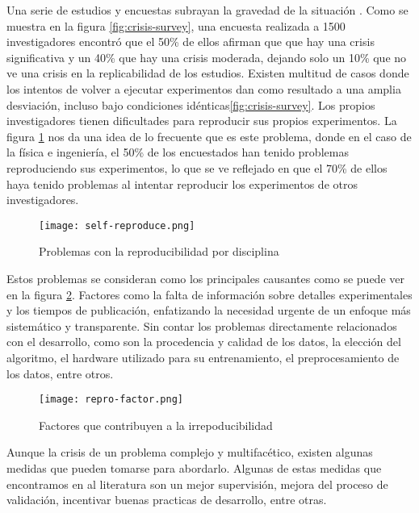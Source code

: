 Una serie de estudios y encuestas subrayan la gravedad de la situación \cite{Baker_2016}.
Como se muestra en la figura \ref{fig:crisis-survey}, una encuesta realizada a 1500 investigadores
encontró que el 50\% de ellos afirman que que hay una crisis significativa y un 40\% que hay
una crisis moderada, dejando solo un 10\% que no ve una crisis en la replicabilidad de los estudios.
Existen multitud de casos donde los intentos de volver a ejecutar experimentos dan como resultado 
a una amplia desviación, incluso bajo condiciones idénticas\ref{fig:crisis-survey}.
Los propios investigadores tienen dificultades para reproducir sus propios experimentos.
La figura \ref{fig:self-reproduce} nos da una idea de lo frecuente que es este problema,
donde en el caso de la física e ingeniería, el 50\% de los encuestados han tenido problemas
reproduciendo sus experimentos, lo que se ve reflejado en que el 70\% de ellos haya tenido
problemas al intentar reproducir los experimentos de otros investigadores.

\begin{figure}[ht]
    \centering
    \texttt{[image: self-reproduce.png]}
    \caption{Problemas con la reproducibilidad por disciplina \cite{Baker_2016}}\label{fig:self-reproduce}
\end{figure}

Estos problemas se consideran como los principales causantes como se puede ver en la figura \ref{fig:repro-factor}.
Factores como la falta de información sobre detalles experimentales y los tiempos de publicación, enfatizando 
la necesidad urgente de un enfoque más sistemático y transparente. Sin contar los problemas
directamente relacionados con el desarrollo, como son la procedencia y calidad de los datos, la 
elección del algoritmo, el hardware utilizado para su entrenamiento, el preprocesamiento de 
los datos, entre otros.

\begin{figure}[ht]
    \centering
    \texttt{[image: repro-factor.png]}
    \caption{Factores que contribuyen a la irrepoducibilidad \cite{Baker_2016}}\label{fig:repro-factor}
\end{figure}

Aunque la crisis de un problema complejo y multifacético, existen
algunas medidas que pueden tomarse para abordarlo. Algunas de estas medidas que encontramos
en al literatura son un mejor supervisión, mejora del proceso de validación, incentivar
buenas practicas de desarrollo, entre otras. 

